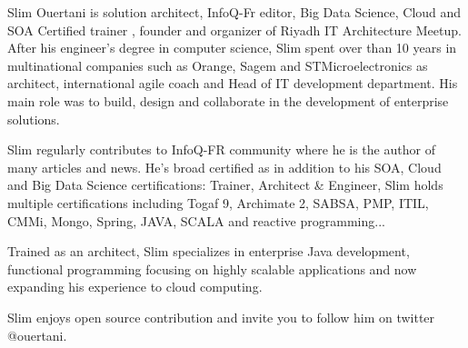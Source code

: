 \documentclass[10pt,a4paper]{article}
\begin{document}
\vspace{-1.3em}  %
\begin{multicols}{2}  %
\hspace{0.5cm} Slim Ouertani is solution architect, InfoQ-Fr editor, Big Data Science, Cloud and SOA Certified trainer , founder and organizer of Riyadh IT Architecture Meetup.
After his engineer's degree in computer science, Slim spent over than 10 years in multinational companies such as Orange, Sagem and STMicroelectronics as architect, international agile coach and Head of IT development department.
His main role was to build, design and collaborate in the development of enterprise solutions.

\hspace{0.5cm} Slim regularly contributes to InfoQ-FR community where he is the author of many articles and news.
He's broad certified as in addition to his SOA, Cloud and Big Data Science certifications: Trainer, Architect \& Engineer, Slim  holds multiple certifications including Togaf 9, Archimate 2, SABSA, PMP, ITIL, CMMi, Mongo, Spring, JAVA, SCALA and reactive programming...

\hspace{0.5cm} Trained as an architect, Slim specializes in enterprise Java development, functional programming focusing on highly scalable applications and now expanding his experience to cloud computing.

\hspace{0.5cm} Slim enjoys open source contribution and invite you to follow him on twitter @ouertani.

\end{multicols}


\spacedhrule{0em}{-0.4em}

\end{document}

